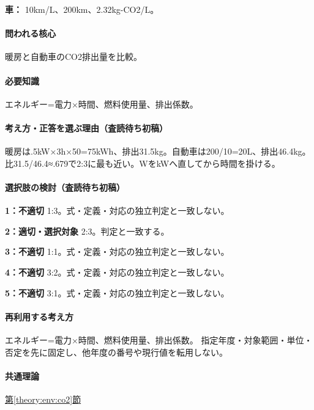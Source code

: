 \noindent\textbf{車：} 10km/L、200km、2.32kg-CO2/L。\par

\paragraph{問われる核心} 暖房と自動車のCO2排出量を比較。

\paragraph{必要知識} エネルギー=電力×時間、燃料使用量、排出係数。

\paragraph{考え方・正答を選ぶ理由（査読待ち初稿）} 暖房は.5kW×3h×50=\allowbreak{}75kWh、排出31.5kg。自動車は200/10=\allowbreak{}20L、排出46.4kg。比31.5/46.4≈.679で2:3に最も近い。WをkWへ直してから時間を掛ける。

\paragraph{選択肢の検討（査読待ち初稿）}\mbox{}\par

\noindent\textbf{1：不適切} 1:3。式・定義・対応の独立判定と一致しない。\par

\noindent\textbf{2：適切・選択対象} 2:3。判定と一致する。\par

\noindent\textbf{3：不適切} 1:1。式・定義・対応の独立判定と一致しない。\par

\noindent\textbf{4：不適切} 3:2。式・定義・対応の独立判定と一致しない。\par

\noindent\textbf{5：不適切} 3:1。式・定義・対応の独立判定と一致しない。\par

\paragraph{再利用する考え方} エネルギー=電力×時間、燃料使用量、排出係数。 指定年度・対象範囲・単位・否定を先に固定し、他年度の番号や現行値を転用しない。

\paragraph{共通理論} \hyperref[theory:env:co2]{第\ref*{theory:env:co2}節}

